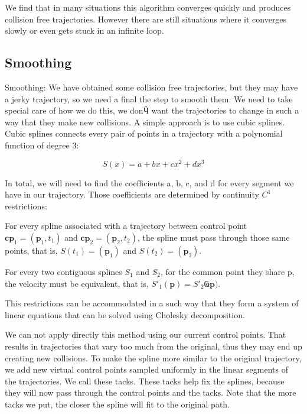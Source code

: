 We find that in many situations this algorithm converges quickly and produces collision free trajectories. However there are still situations where it converges slowly or even gets stuck in an infinite loop.

\subsection{Smoothing}
\label{sec:method:smoothing}

Smoothing:
We have obtained some collision free trajectories, but they may have a jerky trajectory, so we need a final the step to smooth them. We need to take special care of how we do this, we donӴ want the trajectories to change in such a way that they make new collisions. A simple approach is to use cubic splines. Cubic splines connects every pair of points in a trajectory with a polynomial function of degree $3$:

\begin{equation}
 S(x)=a+bx+ cx^2+ dx^3
\end{equation}

In total, we will need to find the coefficients a, b, c, and d for every segment we have in our trajectory. Those coefficients are determined by continuity $C^1$ restrictions: 

For every spline associated with a trajectory between control point $\mathbf{cp}_1=(\mathbf{p}_1,t_1)$ and $\mathbf{cp}_2=(\mathbf{p}_2,t_2)$, the spline must pass through those same points, that is, $S(t_1)=(\mathbf{p}_1)$ and $S(t_2)=(\mathbf{p}_2)$.

For every two contiguous splines $S_1$ and $S_2$, for the common point they share p, the velocity must be equivalent, that is,  $S'_1(\mathbf{p})=S'_2Ҩ\mathbf{p})$.
  
This restrictions can be accommodated in a such way that they form a system of linear equations that can be solved using Cholesky decomposition.

We can not apply directly this method using our current control points. That results in trajectories that vary too much from the original, thus they may end up creating new collisions. To make the spline more similar to the original trajectory, we add new virtual control points sampled uniformly in the linear segments of the trajectories. We call these tacks. These tacks help fix the splines, because they will now pass through the control points and the tacks. Note that the more tacks we put, the closer the spline will fit to the original path.

